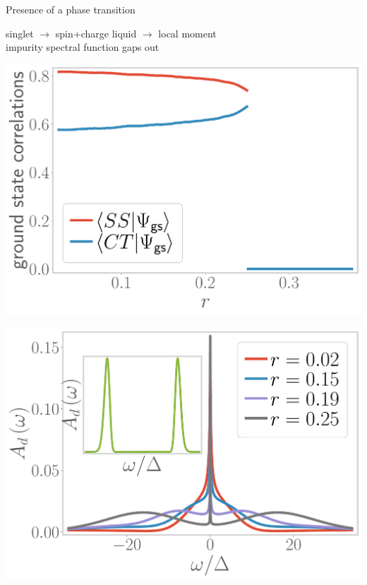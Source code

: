 \documentclass[11pt,aspectratio=169]{beamer}
\begin{document}
\begin{frame}{Presence of a phase transition}

singlet {\LARGE \(\longrightarrow\)} spin+charge liquid {\LARGE \(\longrightarrow\)} local moment\\[10pt]
impurity spectral function gaps out\\[10pt]

\begin{minipage}{0.49\textwidth}
	\includegraphics[width=\textwidth]{corrs_gs.pdf}
\end{minipage}
\hspace*{\fill}
\begin{minipage}{0.49\textwidth}
	\includegraphics[width=\textwidth]{Add.pdf}
\end{minipage}

\end{frame}
\end{document}
